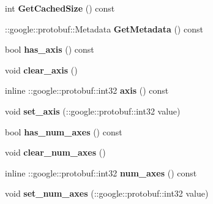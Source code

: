 \begin{DoxyCompactItemize}
int {\bfseries Get\+Cached\+Size} () const
\item 
\mbox{\label{classcaffe_1_1_bias_parameter_af7db1762e25d3d5001f6aa7275ac7506}} 
\+::google\+::protobuf\+::\+Metadata {\bfseries Get\+Metadata} () const
\item 
\mbox{\label{classcaffe_1_1_bias_parameter_ad9d903a3e139c81c46b9dc972886627a}} 
bool {\bfseries has\+\_\+axis} () const
\item 
\mbox{\label{classcaffe_1_1_bias_parameter_a82f950568ee96ddff90b7068659f2a6c}} 
void {\bfseries clear\+\_\+axis} ()
\item 
\mbox{\label{classcaffe_1_1_bias_parameter_a7cc3476f31520484d5c31fd241e25ae0}} 
inline \+::google\+::protobuf\+::int32 {\bfseries axis} () const
\item 
\mbox{\label{classcaffe_1_1_bias_parameter_a7139c7f0c2272974ac042c0b0740c5a4}} 
void {\bfseries set\+\_\+axis} (\+::google\+::protobuf\+::int32 value)
\item 
\mbox{\label{classcaffe_1_1_bias_parameter_a89c0228f4a07380a38bf95293d9298af}} 
bool {\bfseries has\+\_\+num\+\_\+axes} () const
\item 
\mbox{\label{classcaffe_1_1_bias_parameter_a91fb5ba7176b7a693a08c76df5b3e1e5}} 
void {\bfseries clear\+\_\+num\+\_\+axes} ()
\item 
\mbox{\label{classcaffe_1_1_bias_parameter_a5b5a9c6589bcca517483e2b1c24f989c}} 
inline \+::google\+::protobuf\+::int32 {\bfseries num\+\_\+axes} () const
\item 
\mbox{\label{classcaffe_1_1_bias_parameter_a3feb92b1ac71efe1be940319ffcfbe38}} 
void {\bfseries set\+\_\+num\+\_\+axes} (\+::google\+::protobuf\+::int32 value)
\item 
\mbox{\label{classcaffe_1_1_bias_parameter_ae3a95242f96890713709d2155b6497e3}} 

\end{DoxyCompactItemize}
